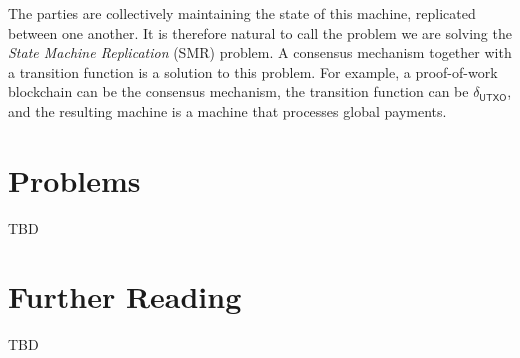 The parties are collectively maintaining the state of this machine, replicated between one another.
It is therefore natural to call the problem we are solving the
\emph{State Machine Replication} (SMR)
problem. A consensus mechanism together with a transition function is a solution to this problem.
For example, a proof-of-work blockchain can be the consensus mechanism, the transition function
can be $\delta_\textsf{UTXO}$, and the resulting machine is a machine that processes global payments.


\section*{Problems}

TBD


\section*{Further Reading}

TBD

